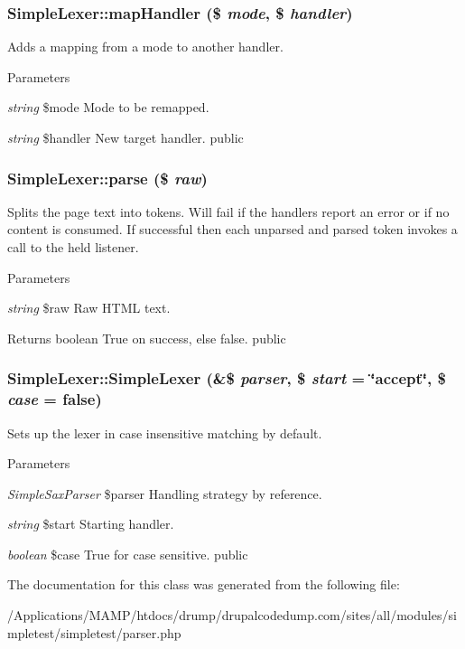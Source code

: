 \hypertarget{class_simple_lexer_ad84116197560273d3fd02bd5e74dfe81}{
\subsubsection[{mapHandler}]{\setlength{\rightskip}{0pt plus 5cm}SimpleLexer::mapHandler (\$ {\em mode}, \/  \$ {\em handler})}}
\label{class_simple_lexer_ad84116197560273d3fd02bd5e74dfe81}
Adds a mapping from a mode to another handler. 
\begin{DoxyParams}{Parameters}
\item[{\em string}]\$mode Mode to be remapped. \item[{\em string}]\$handler New target handler.  public \end{DoxyParams}
\hypertarget{class_simple_lexer_afeceabe5e976b20b1e14fed952d79107}{
\subsubsection[{parse}]{\setlength{\rightskip}{0pt plus 5cm}SimpleLexer::parse (\$ {\em raw})}}
\label{class_simple_lexer_afeceabe5e976b20b1e14fed952d79107}
Splits the page text into tokens. Will fail if the handlers report an error or if no content is consumed. If successful then each unparsed and parsed token invokes a call to the held listener. 
\begin{DoxyParams}{Parameters}
\item[{\em string}]\$raw Raw HTML text. \end{DoxyParams}
\begin{DoxyReturn}{Returns}
boolean True on success, else false.  public 
\end{DoxyReturn}
\hypertarget{class_simple_lexer_ae2bb586444d1d4ce1ef521b9f6b2bc75}{
\subsubsection[{SimpleLexer}]{\setlength{\rightskip}{0pt plus 5cm}SimpleLexer::SimpleLexer (\&\$ {\em parser}, \/  \$ {\em start} = {\ttfamily \char`\"{}accept\char`\"{}}, \/  \$ {\em case} = {\ttfamily false})}}
\label{class_simple_lexer_ae2bb586444d1d4ce1ef521b9f6b2bc75}
Sets up the lexer in case insensitive matching by default. 
\begin{DoxyParams}{Parameters}
\item[{\em SimpleSaxParser}]\$parser Handling strategy by reference. \item[{\em string}]\$start Starting handler. \item[{\em boolean}]\$case True for case sensitive.  public \end{DoxyParams}


The documentation for this class was generated from the following file:\begin{DoxyCompactItemize}
\item 
/Applications/MAMP/htdocs/drump/drupalcodedump.com/sites/all/modules/simpletest/simpletest/parser.php\end{DoxyCompactItemize}
